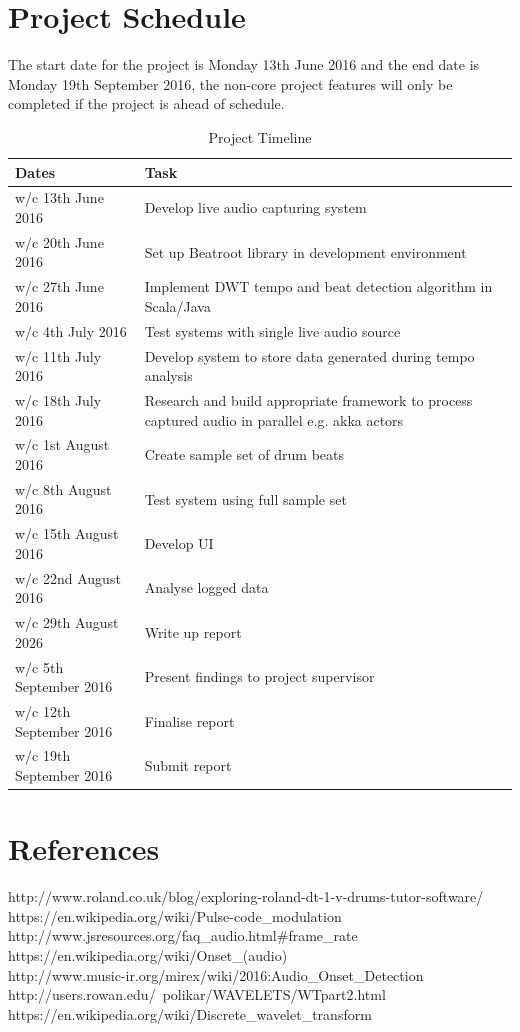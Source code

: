 \documentclass[a4paper, 11pt]{article}
\begin{document}
\section{Project Schedule}
The start date for the project is Monday 13th June 2016 and the end date is Monday 19th September 2016, the non-core project features will only be completed if the project is ahead of schedule.
\begin{table}[h]
\caption{Project Timeline} 
\centering
\begin{tabular}{|p{4cm}|p{8cm}|}
 \hline
\textbf{Dates} & \textbf{Task}\\ [0.5ex]
\hline 
w/c 13th June 2016 & Develop live audio capturing system\\
\hline 
w/c 20th June 2016 & Set up Beatroot library in development environment\\
\hline 
w/c 27th June 2016 & Implement DWT tempo and beat detection algorithm in Scala/Java\\
\hline 
w/c 4th July 2016 & Test systems with single live audio source\\
\hline 
w/c 11th July 2016 & Develop system to store data generated during tempo analysis\\
\hline 
w/c 18th July 2016 & Research and build appropriate framework to process captured audio in parallel e.g. akka actors\\
\hline 
w/c 1st August 2016 & Create sample set of drum beats\\
\hline 
w/c 8th August 2016 & Test system using full sample set\\
\hline 
w/c 15th August 2016 & Develop UI\\
\hline 
w/c 22nd August 2016 & Analyse logged data\\
\hline 
w/c 29th August 2026 & Write up report\\
\hline 
w/c 5th September 2016 & Present findings to project supervisor\\
\hline 
w/c 12th September 2016 & Finalise report\\
\hline 
w/c 19th September 2016 & Submit report\\
\hline
\end{tabular}
\end{table}
\clearpage
\maketitle{} 
\section{References}
http://www.roland.co.uk/blog/exploring-roland-dt-1-v-drums-tutor-software/\\
https://en.wikipedia.org/wiki/Pulse-code\_modulation\\
http://www.jsresources.org/faq\_audio.html\#frame\_rate\\
https://en.wikipedia.org/wiki/Onset\_(audio)\\
http://www.music-ir.org/mirex/wiki/2016:Audio\_Onset\_Detection\\
http://users.rowan.edu/~polikar/WAVELETS/WTpart2.html\\
https://en.wikipedia.org/wiki/Discrete\_wavelet\_transform\\
\end{document}
